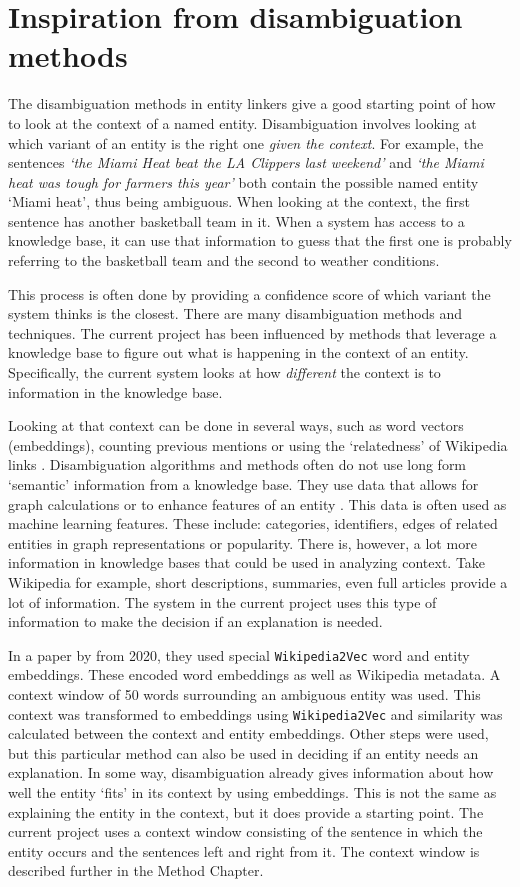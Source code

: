 \documentclass[
10pt, %
a4paper, %
oneside, %
headinclude,footinclude, %
] {book}%
\begin{document}
\section{Inspiration from disambiguation methods}
The disambiguation methods in entity linkers give a good starting point of how to look at the context of a named entity.
Disambiguation involves looking at which variant of an entity is the right one \textit{given the context}.
For example, the sentences \textit{`the Miami Heat beat the LA Clippers last weekend'} and \textit{`the Miami heat was tough for farmers this year'} both contain the possible named entity `Miami heat', thus being ambiguous.
When looking at the context, the first sentence has another basketball team in it.
When a system has access to a knowledge base, it can use that information to guess that the first one is probably referring to the basketball team and the second to weather conditions.

This process is often done by providing a confidence score of which variant the system thinks is the closest.
There are many disambiguation methods and techniques.
The current project has been influenced by methods that leverage a knowledge base to figure out what is happening in the context of an entity.
Specifically, the current system looks at how \textit{different} the context is to information in the knowledge base.

Looking at that context can be done in several ways, such as word vectors (embeddings), counting previous mentions or using the `relatedness' of Wikipedia links \citep{delpeuch2019,ma2019,vanhulst2020}.
Disambiguation algorithms and methods often do not use long form `semantic' information from a knowledge base.
They use data that allows for graph calculations or to enhance features of an entity \citep{rao2013}.
This data is often used as machine learning features.
These include: categories, identifiers, edges of related entities in graph representations or popularity.
There is, however, a lot more information in knowledge bases that could be used in analyzing context.
Take Wikipedia for example, short descriptions, summaries, even full articles provide a lot of information.
The system in the current project uses this type of information to make the decision if an explanation is needed.

In a paper by \citeauthor{vanhulst2020} from 2020, they used special \verb+Wikipedia2Vec+ word and entity embeddings.
These encoded word embeddings as well as Wikipedia metadata.
A context window of 50 words surrounding an ambiguous entity was used.
This context was transformed to embeddings using \verb+Wikipedia2Vec+ and similarity was calculated between the context and entity embeddings.
Other steps were used, but this particular method can also be used in deciding if an entity needs an explanation.
In some way, disambiguation already gives information about how well the entity `fits' in its context by using embeddings.
This is not the same as explaining the entity in the context, but it does provide a starting point.
The current project uses a context window consisting of the sentence in which the entity occurs and the sentences left and right from it.
The context window is described further in the Method Chapter.
\end{document}
